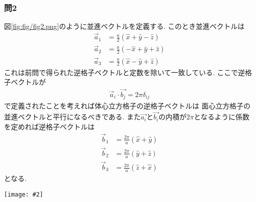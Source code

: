 \documentclass[uplatex,a4j,11pt,dvipdfmx]{jsarticle}
\makeatletter
\def\fgcaption{\def\@captype{figure}\caption}
\newcommand{\mfig}[3][width=15cm]{
\begin{center}
\texttt{[image: \#2]}
\fgcaption{#3 \label{fig:#2}}
\end{center}
}
\makeatother
\begin{document}
\subsubsection*{問2}
図\ref{fig:fig/fig2.png}のように並進ベクトルを定義する.
このとき並進ベクトルは
\begin{align}
  \vec{a}_1&=\frac{a}{2}(\hat{x}+\hat{y}-\hat{z})\\
  \vec{a}_2&=\frac{a}{2}(-\hat{x}+\hat{y}+\hat{z})\\
  \vec{a}_3&=\frac{a}{2}(\hat{x}-\hat{y}+\hat{z})
\end{align}
これは前問で得られた逆格子ベクトルと定数を除いて一致している.
ここで逆格子ベクトルが
\begin{align}
  \vec{a}_i\cdot\vec{b_j}=2\pi\delta_{ij}
\end{align}
で定義されたことを考えれば体心立方格子の逆格子ベクトルは
面心立方格子の並進ベクトルと平行になるべきである.
また$\vec{a_i}$と$\vec{b_i}$の内積が$2\pi$となるように係数を定めれば逆格子ベクトルは
\begin{align}
  \vec{b}_1&=\frac{2\pi}{a}(\hat{x}+\hat{y})\\
  \vec{b}_2&=\frac{2\pi}{a}(\hat{y}+\hat{z})\\
  \vec{b}_3&=\frac{2\pi}{a}(\hat{z}+\hat{x})
\end{align}
となる.
\mfig[width=8cm]{fig/fig2.png}{体心立方格子での並進ベクトルの定義}
\end{document}
